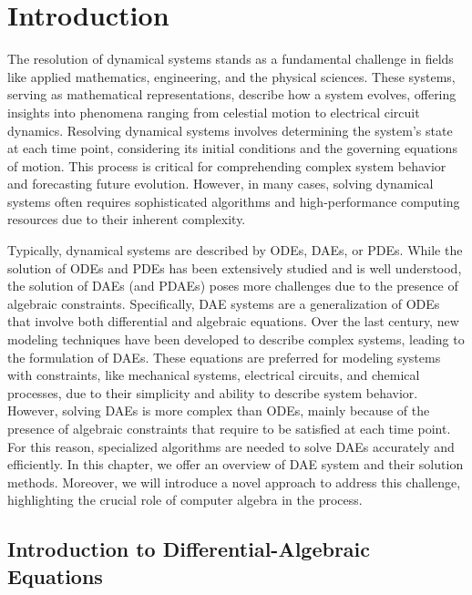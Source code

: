 
\chapter{Introduction}
\label{chap1:introduction}

The resolution of dynamical systems stands as a fundamental challenge in fields like applied mathematics, engineering, and the physical sciences. These systems, serving as mathematical representations, describe how a system evolves, offering insights into phenomena ranging from celestial motion to electrical circuit dynamics. Resolving dynamical systems involves determining the system's state at each time point, considering its initial conditions and the governing equations of motion. This process is critical for comprehending complex system behavior and forecasting future evolution. However, in many cases, solving dynamical systems often requires sophisticated algorithms and high-performance computing resources due to their inherent complexity.


Typically, dynamical systems are described by \acp{ODE}, \acp{DAE}, or \acp{PDE}. While the solution of \acp{ODE} and \acp{PDE} has been extensively studied and is well understood, the solution of \acp{DAE} (and \acp{PDAE}) poses more challenges due to the presence of algebraic constraints. Specifically, \ac{DAE} systems are a generalization of \acp{ODE} that involve both differential and algebraic equations. Over the last century, new modeling techniques have been developed to describe complex systems, leading to the formulation of \acp{DAE}. These equations are preferred for modeling systems with constraints, like mechanical systems, electrical circuits, and chemical processes, due to their simplicity and ability to describe system behavior. However, solving \acp{DAE} is more complex than \acp{ODE}, mainly because of the presence of algebraic constraints that require to be satisfied at each time point. For this reason, specialized algorithms are needed to solve \acp{DAE} accurately and efficiently. In this chapter, we offer an overview of \ac{DAE} system and their solution methods. Moreover, we will introduce a novel approach to address this challenge, highlighting the crucial role of computer algebra in the process.


\section{Introduction to Differential-Algebraic Equations}

